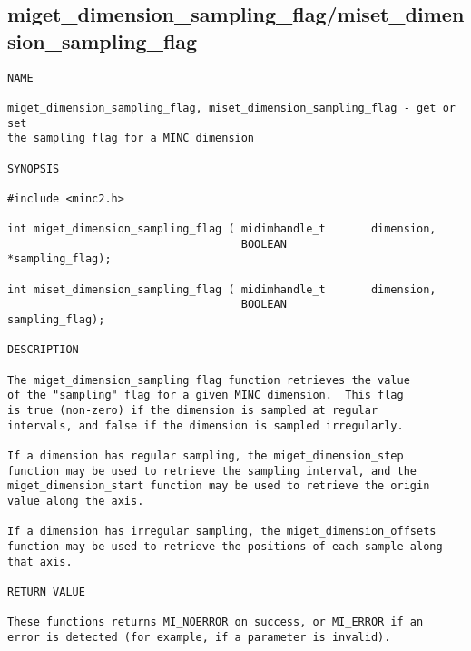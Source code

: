 \documentclass{article}
\begin{document}
\subsection{miget\_dimension\_sampling\_flag/miset\_dimension\_sampling\_flag}
\begin{verbatim}
NAME

miget_dimension_sampling_flag, miset_dimension_sampling_flag - get or set
the sampling flag for a MINC dimension

SYNOPSIS

#include <minc2.h>

int miget_dimension_sampling_flag ( midimhandle_t       dimension,
                                    BOOLEAN             *sampling_flag);

int miset_dimension_sampling_flag ( midimhandle_t       dimension,
                                    BOOLEAN             sampling_flag);

DESCRIPTION

The miget_dimension_sampling flag function retrieves the value
of the "sampling" flag for a given MINC dimension.  This flag
is true (non-zero) if the dimension is sampled at regular
intervals, and false if the dimension is sampled irregularly.

If a dimension has regular sampling, the miget_dimension_step
function may be used to retrieve the sampling interval, and the
miget_dimension_start function may be used to retrieve the origin
value along the axis.

If a dimension has irregular sampling, the miget_dimension_offsets
function may be used to retrieve the positions of each sample along
that axis.

RETURN VALUE

These functions returns MI_NOERROR on success, or MI_ERROR if an 
error is detected (for example, if a parameter is invalid).
\end{verbatim}
\end{document}
